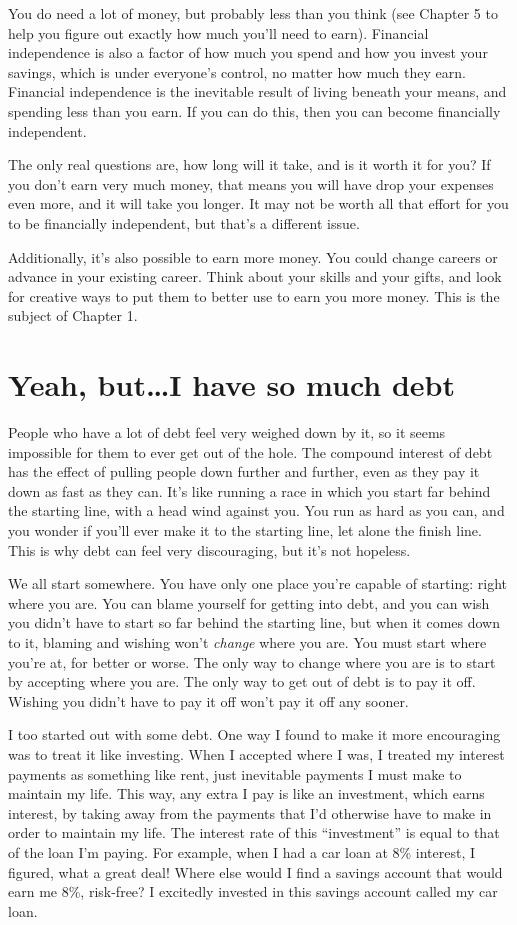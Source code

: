 You do need a lot of money, but probably less than you think (see Chapter 5 to help you figure out exactly how much you'll need to earn). Financial independence is also a factor of how much you spend and how you invest your savings, which is under everyone's control, no matter how much they earn. Financial independence is the inevitable result of living beneath your means, and spending less than you earn. If you can do this, then you can become financially independent.

The only real questions are, how long will it take, and is it worth it for you? If you don't earn very much money, that means you will have drop your expenses even more, and it will take you longer. It may not be worth all that effort for you to be financially independent, but that's a different issue.

Additionally, it's also possible to earn more money. You could change careers or advance in your existing career. Think about your skills and your gifts, and look for creative ways to put them to better use to earn you more money. This is the subject of Chapter 1.

\section{Yeah, but\ldots I have so much debt}
People who have a lot of debt feel very weighed down by it, so it seems impossible for them to ever get out of the hole. The compound interest of debt has the effect of pulling people down further and further, even as they pay it down as fast as they can. It's like running a race in which you start far behind the starting line, with a head wind against you. You run as hard as you can, and you wonder if you'll ever make it to the starting line, let alone the finish line. This is why debt can feel very discouraging, but it's not hopeless.

We all start somewhere. You have only one place you're capable of starting: right where you are. You can blame yourself for getting into debt, and you can wish you didn't have to start so far behind the starting line, but when it comes down to it, blaming and wishing won't \emph{change} where you are. You must start where you're at, for better or worse. The only way to change where you are is to start by accepting where you are. The only way to get out of debt is to pay it off. Wishing you didn't have to pay it off won't pay it off any sooner.

I too started out with some debt. One way I found to make it more encouraging was to treat it like investing. When I accepted where I was, I treated my interest payments as something like rent, just inevitable payments I must make to maintain my life. This way, any extra I pay is like an investment, which earns interest, by taking away from the payments that I'd otherwise have to make in order to maintain my life. The interest rate of this ``investment'' is equal to that of the loan I'm paying. For example, when I had a car loan at 8\% interest, I figured, what a great deal! Where else would I find a savings account that would earn me 8\%, risk-free? I excitedly invested in this savings account called my car loan.

